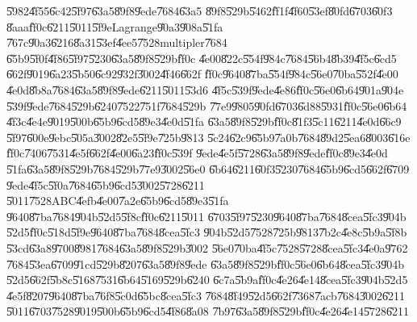 \U{5982}\U{4f55}\U{6c42}\U{5f97}\U{63a5}\U{89f8}\U{9ede}\U{7684}\U{63a5}%
\U{89f8}\U{529b}\U{5462}\U{ff1f}\U{4f60}\U{53ef}\U{80fd}\U{6703}\U{60f3}%
\U{8aaa}\U{ff0c}\U{6211}\U{5011}\U{5f9e}Lagrange\U{90a3}\U{908a}\U{51fa}%
\U{767c}\U{90a3}\U{6216}\U{8a31}\U{53ef}\U{4ee5}\U{7528}multipler\U{7684}%
\U{65b9}\U{5f0f}\U{4f86}\U{5f97}\U{5230}\U{63a5}\U{89f8}\U{529b}\U{ff0c}%
\U{4e00}\U{822c}\U{554f}\U{984c}\U{7684}\U{56b4}\U{8b39}\U{4f5c}\U{6cd5}%
\U{662f}\U{9019}\U{6a23}\U{5b50}\U{6c92}\U{932f}\U{3002}\U{4f46}\U{662f}%
\U{ff0c}\U{9640}\U{87ba}\U{554f}\U{984c}\U{56e0}\U{70ba}\U{552f}\U{4e00}%
\U{4e0d}\U{8b8a}\U{7684}\U{63a5}\U{89f8}\U{9ede}\U{6211}\U{5011}\U{53d6}%
\U{4f5c}\U{539f}\U{9ede}\U{4e86}\U{ff0c}\U{56e0}\U{6b64}\U{901a}\U{904e}%
\U{539f}\U{9ede}\U{7684}\U{529b}\U{6240}\U{7522}\U{751f}\U{7684}\U{529b}%
\U{77e9}\U{9805}\U{90fd}\U{6703}\U{6d88}\U{5931}\U{ff0c}\U{56e0}\U{6b64}%
\U{4f3c}\U{4e4e}\U{9019}\U{500b}\U{65b9}\U{6cd5}\U{89e3}\U{4e0d}\U{51fa}%
\U{63a5}\U{89f8}\U{529b}\U{ff0c}\U{81f3}\U{5c11}\U{6211}\U{4e0d}\U{66c9}%
\U{5f97}\U{600e}\U{9ebc}\U{505a}\U{3002}\U{82e5}\U{5f9e}\U{725b}\U{9813}%
\U{5c24}\U{62c9}\U{65b9}\U{7a0b}\U{7684}\U{89d2}\U{5ea6}\U{8003}\U{616e}%
\U{ff0c}\U{7406}\U{7531}\U{4e5f}\U{662f}\U{4e00}\U{6a23}\U{ff0c}\U{539f}%
\U{9ede}\U{4e5f}\U{5728}\U{63a5}\U{89f8}\U{9ede}\U{ff0c}\U{89e3}\U{4e0d}%
\U{51fa}\U{63a5}\U{89f8}\U{529b}\U{7684}\U{529b}\U{77e9}\U{3002}\U{56e0}%
\U{6b64}\U{6211}\U{60f3}\U{5230}\U{7684}\U{65b9}\U{6cd5}\U{662f}\U{6709}%
\U{9ede}\U{4f5c}\U{5f0a}\U{7684}\U{65b9}\U{6cd5}\U{3002}\U{5728}\U{6211}%
\U{5011}\U{7528}ABC\U{4efb}\U{4e00}\U{7a2e}\U{65b9}\U{6cd5}\U{89e3}\U{51fa}%
\U{9640}\U{87ba}\U{7684}\U{904b}\U{52d5}\U{5f8c}\U{ff0c}\U{6211}\U{5011}%
\U{6703}\U{5f97}\U{5230}\U{9640}\U{87ba}\U{7684}\U{8cea}\U{5fc3}\U{904b}%
\U{52d5}\U{ff0c}\U{518d}\U{5f9e}\U{9640}\U{87ba}\U{7684}\U{8cea}\U{5fc3}%
\U{904b}\U{52d5}\U{7528}\U{725b}\U{9813}\U{7b2c}\U{4e8c}\U{5b9a}\U{5f8b}%
\U{53cd}\U{63a8}\U{9700}\U{8981}\U{7684}\U{63a5}\U{89f8}\U{529b}\U{3002}%
\U{56e0}\U{70ba}\U{4f5c}\U{7528}\U{5728}\U{8cea}\U{5fc3}\U{4e0a}\U{9762}%
\U{7684}\U{53ea}\U{6709}\U{91cd}\U{529b}\U{8207}\U{63a5}\U{89f8}\U{9ede}%
\U{63a5}\U{89f8}\U{529b}\U{ff0c}\U{56e0}\U{6b64}\U{8cea}\U{5fc3}\U{904b}%
\U{52d5}\U{662f}\U{5b8c}\U{5168}\U{7531}\U{6b64}\U{5169}\U{529b}\U{6240}%
\U{6c7a}\U{5b9a}\U{ff0c}\U{4e26}\U{4e14}\U{8cea}\U{5fc3}\U{904b}\U{52d5}%
\U{4e5f}\U{8207}\U{9640}\U{87ba}\U{76f8}\U{5c0d}\U{65bc}\U{8cea}\U{5fc3}%
\U{7684}\U{8f49}\U{52d5}\U{662f}\U{7368}\U{7acb}\U{7684}\U{3002}\U{6211}%
\U{5011}\U{6703}\U{7528}\U{9019}\U{500b}\U{65b9}\U{6cd5}\U{4f86}\U{8a08}%
\U{7b97}\U{63a5}\U{89f8}\U{529b}\U{ff0c}\U{4e26}\U{4e14}\U{5728}\U{6211}%
